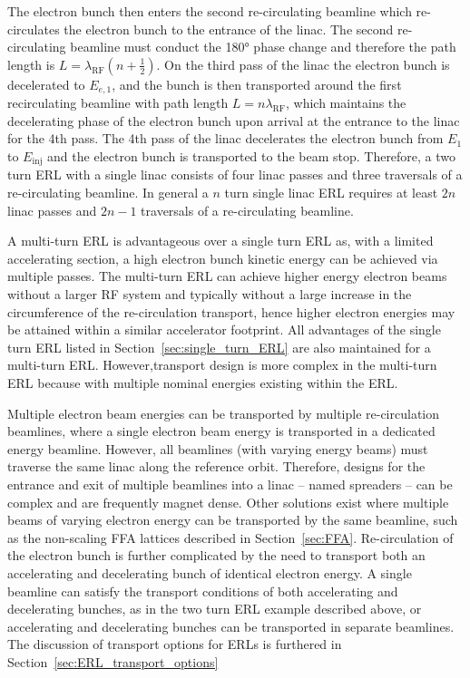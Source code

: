 \documentclass[../main.tex]{subfiles}
\begin{document}
The electron bunch then enters the second re-circulating beamline which re-circulates the electron bunch to the entrance of the linac. The second re-circulating beamline must conduct the 180\si{\degree} phase change and therefore the path length is $L=\lambda_{\mathrm{RF}}\left(n+\frac{1}{2}\right)$. On the third pass of the linac the electron bunch is decelerated to $E_{e,1}$, and the bunch is then transported around the first recirculating beamline with path length $L=n\lambda_{\mathrm{RF}}$, which maintains the decelerating phase of the electron bunch upon arrival at the entrance to the linac for the 4th pass. The 4th pass of the linac decelerates the electron bunch from $E_{1}$ to $E_{\mathrm{inj}}$ and the electron bunch is transported to the beam stop. Therefore, a two turn ERL with a single linac consists of four linac passes and three traversals of a re-circulating beamline. In general a $n$ turn single linac ERL requires at least $2n$ linac passes and $2n-1$ traversals of a re-circulating beamline.

A multi-turn ERL is advantageous over a single turn ERL as, with a limited accelerating section, a high electron bunch kinetic energy can be achieved via multiple passes. The multi-turn ERL can achieve higher energy electron beams without a larger RF system and typically without a large increase in the circumference of the re-circulation transport, hence higher electron energies may be attained within a similar accelerator footprint. All advantages of the single turn ERL listed in Section~\ref{sec:single_turn_ERL} are also maintained for a multi-turn ERL. However,transport design is more complex in the multi-turn ERL because with multiple nominal energies existing within the ERL.

Multiple electron beam energies can be transported by multiple re-circulation beamlines, where a single electron beam energy is transported in a dedicated energy beamline. However, all beamlines (with varying energy beams) must traverse the same linac along the reference orbit. Therefore, designs for the entrance and exit of multiple beamlines into a linac -- named spreaders -- can be complex and are frequently magnet dense. Other solutions exist where multiple beams of varying electron energy can be transported by the same beamline, such as the non-scaling FFA lattices described in Section~\ref{sec:FFA}.  Re-circulation of the electron bunch is further complicated by the need to transport both an accelerating and decelerating bunch of identical electron energy. A single beamline can satisfy the transport conditions of both accelerating and decelerating bunches, as in the two turn ERL example described above, or accelerating and decelerating bunches can be transported in separate beamlines. The discussion of transport options for ERLs is furthered in Section~\ref{sec:ERL_transport_options} 
\end{document}
